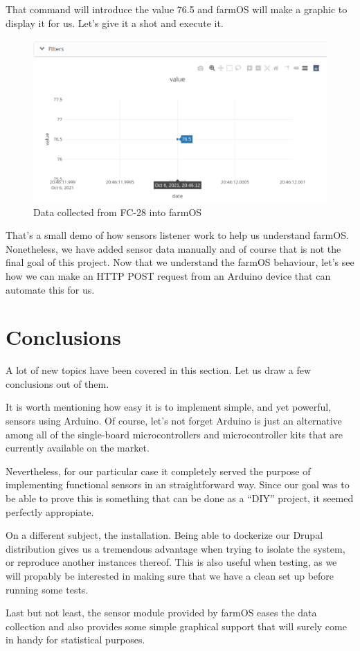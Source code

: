 That command will introduce the value 76.5 and farmOS will make a graphic to display it for us. Let's give it a shot and execute it.

\begin{figure}[H]
    \centering
    \includegraphics[width=1\textwidth]{fig/drupal-install/sensor-data-graphic.png}
    \caption{Data collected from FC-28 into farmOS}
    \label{fig:sensor-data-graphic}
\end{figure}

That's a small demo of how sensors listener work to help us understand farmOS. Nonetheless, we have added sensor data manually and of course that is not the final goal of this project. Now that we understand the farmOS behaviour, let's see how we can make an HTTP POST request from an Arduino device that can automate this for us.

\section{Conclusions}
A lot of new topics have been covered in this section. Let us draw a few conclusions out of them.

It is worth mentioning how easy it is to implement simple, and yet powerful, sensors using Arduino. Of course, let's not forget Arduino is just an alternative among all of the single-board microcontrollers and microcontroller kits that are currently available on the market.

Nevertheless, for our particular case it completely served the purpose of implementing functional sensors in an straightforward way. Since our goal was to be able to prove this is something that can be done as a ``DIY'' project\cite{diy}, it seemed perfectly appropiate.

On a different subject, the installation. Being able to dockerize our Drupal distribution gives us a tremendous advantage when trying to isolate the system, or reproduce another instances thereof. This is also useful when testing, as we will propably be interested in making sure that we have a clean set up before running some tests.

Last but not least, the sensor module provided by farmOS eases the data collection and also provides some simple graphical support that will surely come in handy for statistical purposes.

